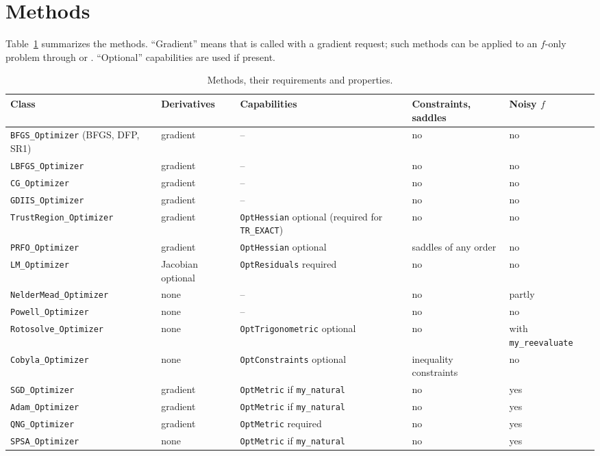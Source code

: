 \section{Methods}\label{sec:optimize:methods}

Table~\ref{tab:optimize:methods} summarizes the methods. ``Gradient'' means that  is called with a gradient
request; such methods can be applied to an $f$-only problem through  or .
``Optional'' capabilities are used if present.

\begin{table}[htbp]
\centering\footnotesize
\caption{Methods, their requirements and properties.}\label{tab:optimize:methods}
\begin{tabular}{@{}>{\raggedright}p{}>{\raggedright}p{}>{\raggedright}p{}>{\raggedright}p{}>{\raggedright\arraybackslash}p{}@{}}
\toprule
Class & Deriva\-tives & Capabilities & Constraints, saddles & Noisy $f$ \\
\midrule
\texttt{BFGS\_Optimizer} (BFGS, DFP, SR1) & gradient & -- & no & no \\
\texttt{LBFGS\_Optimizer} & gradient & -- & no & no \\
\texttt{CG\_Optimizer} & gradient & -- & no & no \\
\texttt{GDIIS\_Optimizer} & gradient & -- & no & no \\
\texttt{TrustRegion\_\-Optimizer} & gradient & \texttt{OptHessian} optional (required for \texttt{TR\_EXACT}) & no & no \\
\texttt{PRFO\_Optimizer} & gradient & \texttt{OptHessian} optional & saddles of any order & no \\
\texttt{LM\_Optimizer} & Jacobian optional & \texttt{OptResiduals} required & no & no \\
\texttt{NelderMead\_\-Optimizer} & none & -- & no & partly \\
\texttt{Powell\_Optimizer} & none & -- & no & no \\
\texttt{Rotosolve\_\-Optimizer} & none & \texttt{OptTrigono\-metric} optional & no & with \texttt{my\_re\-evaluate} \\
\texttt{Cobyla\_Optimizer} & none & \texttt{OptConstraints} optional & inequality constraints & no \\
\texttt{SGD\_Optimizer} & gradient & \texttt{OptMetric} if \texttt{my\_natural} & no & yes \\
\texttt{Adam\_Optimizer} & gradient & \texttt{OptMetric} if \texttt{my\_natural} & no & yes \\
\texttt{QNG\_Optimizer} & gradient & \texttt{OptMetric} required & no & yes \\
\texttt{SPSA\_Optimizer} & none & \texttt{OptMetric} if \texttt{my\_natural} & no & yes \\
\bottomrule
\end{tabular}
\end{table}

